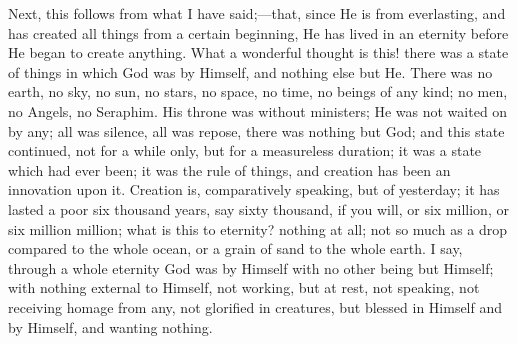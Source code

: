 Next, this follows from what I have said;—that, since He is from
everlasting, and has created all things from a certain beginning, He
has lived in an eternity before He began to create anything. What a
wonderful thought is this! there was a state of things in which God
was by Himself, and nothing else but He. There was no earth, no sky,
no sun, no stars, no space, no time, no beings of any kind; no men, no
Angels, no Seraphim. His throne was without ministers; He was not
waited on by any; all was silence, all was repose, there was nothing
but God; and this state continued, not for a while only, but for a
measureless duration; it was a state which had ever been; it was the
rule of things, and creation has been an innovation upon it. Creation
is, comparatively speaking, but of yesterday; it has lasted a poor six
thousand years, say sixty thousand, if you will, or six million, or
six million million; what is this to eternity? nothing at all; not so
much as a drop compared to the whole ocean, or a grain of sand to the
whole earth. I say, through a whole eternity God was by Himself with
no other being but Himself; with nothing external to Himself, not
working, but at rest, not speaking, not receiving homage from any, not
glorified in creatures, but blessed in Himself and by Himself, and
wanting nothing.

